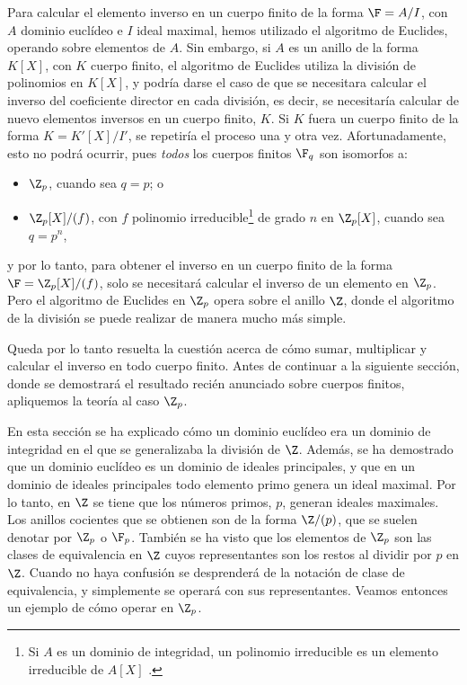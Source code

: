 \begin{TFGampliado}
    \begin{prop}
        Para calcular el elemento inverso en un cuerpo finito de la forma $\F = A/I$, con $A$ dominio euclídeo e $I$ ideal maximal, hemos utilizado el algoritmo de Euclides, operando sobre elementos de $A$. Sin embargo, si $A$ es un anillo de la forma $K[X]$, con $K$ cuerpo finito, el algoritmo de Euclides utiliza la división de polinomios en $K[X]$, y podría darse el caso de que se necesitara calcular el inverso del coeficiente director en cada división, es decir, se necesitaría calcular de nuevo elementos inversos en un cuerpo finito, $K$. Si $K$ fuera un cuerpo finito de la forma $K = K'[X]/I'$, se repetiría el proceso una y otra vez. Afortunadamente, esto no podrá ocurrir, pues \textit{todos} los cuerpos finitos $\F_q$ son isomorfos a:
        \begin{itemize}[label=---]
            \item $\Z_p$, cuando sea $q = p$; o
            \item $\Z_p[X]/(f)$, con $f$ polinomio irreducible\footnote{Si $A$ es un dominio de integridad, un polinomio irreducible es un elemento irreducible de $A[X]$ \cite[p.52]{Rosenberger}.} de grado $n$ en $\Z_p[X]$, cuando sea $q = p^n$,
        \end{itemize}
    y por lo tanto, para obtener el inverso en un cuerpo finito de la forma $\F = \Z_p[X]/(f)$, solo se necesitará calcular el inverso de un elemento en $\Z_p$. Pero el algoritmo de Euclides en $\Z_p$ opera sobre el anillo $\Z$, donde el algoritmo de la división se puede realizar de manera mucho más simple.
    \end{prop}
    
Queda por lo tanto resuelta la cuestión acerca de cómo sumar, multiplicar y calcular el inverso en todo cuerpo finito. Antes de continuar a la siguiente sección, donde se demostrará el resultado recién anunciado sobre cuerpos finitos, apliquemos la teoría al caso $\Z_p$.

\begin{prop}
    En esta sección se ha explicado cómo un dominio euclídeo era un dominio de integridad en el que se generalizaba la división de $\Z$. Además, se ha demostrado que un dominio euclídeo es un dominio de ideales principales, y que en un dominio de ideales principales todo elemento primo genera un ideal maximal. Por lo tanto, en $\Z$ se tiene que los números primos, $p$, generan ideales maximales. Los anillos cocientes que se obtienen son de la forma $\Z/(p)$, que se suelen denotar por $\Z_p$ o $\F_p$. También se ha visto que los elementos de $\Z_p$ son las clases de equivalencia en $\Z$ cuyos representantes son los restos al dividir por $p$ en $\Z$. Cuando no haya confusión se desprenderá de la notación de clase de equivalencia, y simplemente se operará con sus representantes. Veamos entonces un ejemplo de cómo operar en $\Z_p$.
\end{prop}


\end{TFGampliado}
